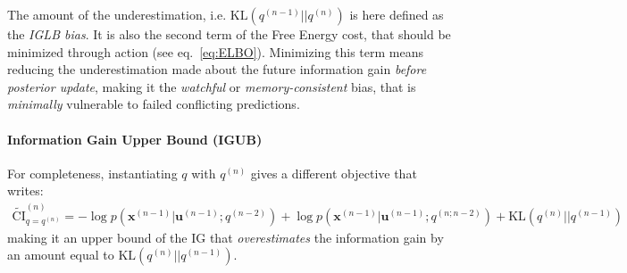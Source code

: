 \documentclass[12pt,twoside,openright]{article}
\begin{document}
{\color{Purple} The amount of the} underestimation, {\color{Purple} i.e. $\text{KL} (q^{(n-1)}||q^{(n)})$} is {\color{Purple} here defined as the \emph{IGLB bias}. It is} also the second term of the Free Energy cost, that should be minimized through action (see eq.~\ref{eq:ELBO}). Minimizing this term means reducing the underestimation made about the future information gain \emph{before posterior update}, making it the \emph{watchful} or \emph{memory-consistent} bias, that is \emph{minimally} vulnerable to failed conflicting predictions.



\paragraph{Information Gain Upper Bound (IGUB)}
{\color{Purple}For completeness, } instantiating $q$ with $q^{(n)}$ gives a different objective  that writes:
\begin{align}
	\tilde{\text{CI}}^{(n)}_{q = q^{(n)}} = 
	-\log p(\boldsymbol{x}^{(n-1)}|\boldsymbol{u}^{(n-1)}; q^{(n-2)}) 
	+ \log p(\boldsymbol{x}^{(n-1)}|\boldsymbol{u}^{(n-1)}; q^{(n;n-2)}) + \text{KL} (q^{(n)}||q^{(n-1)})
\end{align}
making it {\color{Purple} an upper bound of the IG that} \emph{overestimates} the information gain by an amount equal to $\text{KL} (q^{(n)}||q^{(n-1)})$. 
\end{document}
